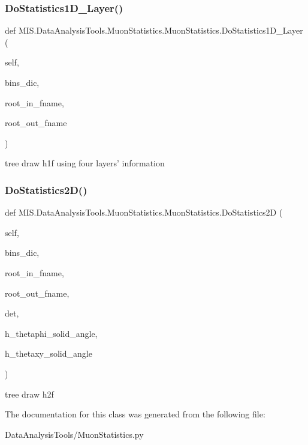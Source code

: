 \subsubsection{\texorpdfstring{Do\+Statistics1\+D\+\_\+Layer()}{DoStatistics1D\_4Layer()}}
{\footnotesize\ttfamily def M\+I\+S.\+Data\+Analysis\+Tools.\+Muon\+Statistics.\+Muon\+Statistics.\+Do\+Statistics1\+D\+\_\+Layer (\begin{DoxyParamCaption}\item[{}]{self,  }\item[{}]{bins\+\_\+dic,  }\item[{}]{root\+\_\+in\+\_\+fname,  }\item[{}]{root\+\_\+out\+\_\+fname }\end{DoxyParamCaption})}

\begin{DoxyVerb}tree draw h1f using four layers' information\end{DoxyVerb}
 \mbox{\label{classMIS_1_1DataAnalysisTools_1_1MuonStatistics_1_1MuonStatistics_a5669bb230b1b06cd0900fad517f0e560}} 
\subsubsection{\texorpdfstring{Do\+Statistics2\+D()}{DoStatistics2D()}}
{\footnotesize\ttfamily def M\+I\+S.\+Data\+Analysis\+Tools.\+Muon\+Statistics.\+Muon\+Statistics.\+Do\+Statistics2D (\begin{DoxyParamCaption}\item[{}]{self,  }\item[{}]{bins\+\_\+dic,  }\item[{}]{root\+\_\+in\+\_\+fname,  }\item[{}]{root\+\_\+out\+\_\+fname,  }\item[{}]{det,  }\item[{}]{h\+\_\+thetaphi\+\_\+solid\+\_\+angle,  }\item[{}]{h\+\_\+thetaxy\+\_\+solid\+\_\+angle }\end{DoxyParamCaption})}

\begin{DoxyVerb}tree draw h2f\end{DoxyVerb}
 

The documentation for this class was generated from the following file\+:\begin{DoxyCompactItemize}
\item 
Data\+Analysis\+Tools/Muon\+Statistics.\+py\end{DoxyCompactItemize}
